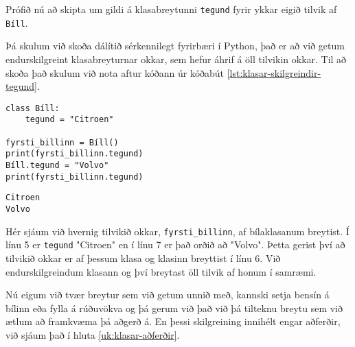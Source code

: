 Prófið nú að skipta um gildi á klasabreytunni \texttt{tegund} fyrir ykkar eigið tilvik af \texttt{Bíll}.

Þá skulum við skoða dálítið sérkennilegt fyrirbæri í Python, það er að við getum endurskilgreint klasabreyturnar okkar, sem hefur áhrif á öll tilvikin okkar.
Til að skoða það skulum við nota aftur kóðann úr kóðabút \ref{lst:klasar-skilgreindir-tegund}.

\begin{lstlisting}[caption=Endurskilgreining á því sem klasinn býður upp á, label=lst:klasar-skilgreindir-tegund2]
class Bíll:
	tegund = "Citroen"
	
fyrsti_billinn = Bíll()
print(fyrsti_billinn.tegund)
Bíll.tegund = "Volvo"
print(fyrsti_billinn.tegund)
\end{lstlisting}
\lstset{style=uttak}
\begin{lstlisting}
Citroen
Volvo
\end{lstlisting}
\lstset{style=venjulegt}

Hér sjáum við hvernig tilvikið okkar, \texttt{fyrsti\_billinn}, af bílaklasanum breytist.
Í línu 5 er \texttt{tegund} "Citroen" en í línu 7 er það orðið að "Volvo".
Þetta gerist því að tilvikið okkar er af þessum klasa og klasinn breyttist í línu 6.
Við endurskilgreindum klasann og því breytast öll tilvik af honum í samræmi.

Nú eigum við tvær breytur sem við getum unnið með, kannski setja bensín á bílinn eða fylla á rúðuvökva og þá gerum við það við þá tilteknu breytu sem við ætlum að framkvæma þá aðgerð á.
En þessi skilgreining innihélt engar aðferðir, við sjáum það í hluta  \ref{uk:klasar-aðferðir}.


